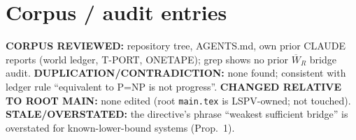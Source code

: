 \documentclass{article}
\begin{document}
\section*{Corpus / audit entries}
\textbf{CORPUS REVIEWED:} repository tree, AGENTS.md, own prior CLAUDE reports (world ledger, T-PORT, ONETAPE); grep shows no prior $\overline W_R$ bridge audit. \textbf{DUPLICATION/CONTRADICTION:} none found; consistent with ledger rule ``equivalent to P=NP is not progress''. \textbf{CHANGED RELATIVE TO ROOT MAIN:} none edited (root \texttt{main.tex} is LSPV-owned; not touched). \textbf{STALE/OVERSTATED:} the directive's phrase ``weakest sufficient bridge'' is overstated for known-lower-bound systems (Prop.~1).

\end{document}
